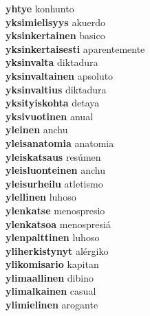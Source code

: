 \textbf{yhtye } konhunto \\
\textbf{yksimielisyys } akuerdo \\
\textbf{yksinkertainen } basico \\
\textbf{yksinkertaisesti } aparentemente \\
\textbf{yksinvalta } diktadura \\
\textbf{yksinvaltainen } apsoluto \\
\textbf{yksinvaltius } diktadura \\
\textbf{yksityiskohta } detaya \\
\textbf{yksivuotinen } anual \\
\textbf{yleinen } anchu \\
\textbf{yleisanatomia } anatomia \\
\textbf{yleiskatsaus } resúmen \\
\textbf{yleisluonteinen } anchu \\
\textbf{yleisurheilu } atletismo \\
\textbf{ylellinen } luhoso \\
\textbf{ylenkatse } menospresio \\
\textbf{ylenkatsoa } menospresiá \\
\textbf{ylenpalttinen } luhoso \\
\textbf{yliherkistynyt } alérgiko \\
\textbf{ylikomisario } kapitan \\
\textbf{ylimaallinen } dibino \\
\textbf{ylimalkainen } casual \\
\textbf{ylimielinen } arogante \\
